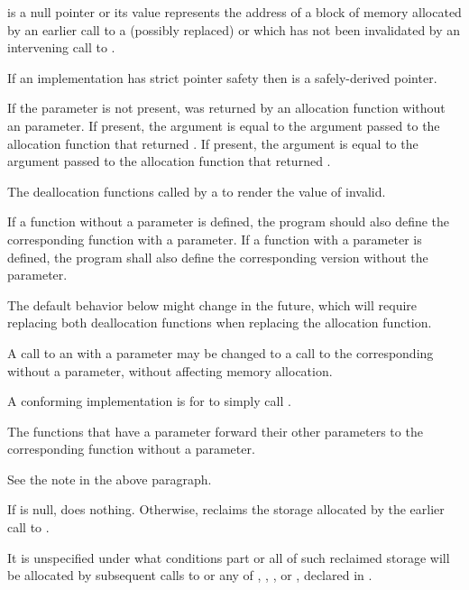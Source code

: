 \begin{itemdescr}
\pnum
\expects
{} is a null pointer or
its value represents the address of
a block of memory allocated by
an earlier call to a (possibly replaced)
or
which has not been invalidated by an intervening call to
.

\pnum
If an implementation has strict pointer safety
then  is a safely-derived pointer.

\pnum
If the  parameter is not present,
 was returned by an allocation function
without an  parameter.
If present, the  argument
is equal to the  argument
passed to the allocation function that returned .
If present, the  argument
is equal to the  argument
passed to the allocation function that returned .

\pnum
\effects
The
deallocation functions
called by a
to render the value of  invalid.

\pnum
\replaceable
{}
If a function without a  parameter is defined,
the program should also define
the corresponding function with a  parameter.
If a function with a  parameter is defined,
the program shall also define
the corresponding version without the  parameter.
\begin{note}
The default behavior below might change in the future, which will require
replacing both deallocation functions when replacing the allocation function.
\end{note}

\pnum
\required
A call to an 
with a  parameter
may be changed to
a call to the corresponding 
without a  parameter,
without affecting memory allocation.
\begin{note}
A conforming implementation is for
 to simply call
.
\end{note}

\pnum
{}
The functions that have a  parameter
forward their other parameters
to the corresponding function without a  parameter.
\begin{note}
See the note in the above \replaceable paragraph.
\end{note}

\pnum
{}
If  is null, does nothing. Otherwise, reclaims the
storage allocated by the earlier call to .

\pnum
\remarks
It is unspecified under what conditions part or all of such
%
reclaimed storage will be allocated by subsequent
calls to
or any of
,
,
,
or
,
declared in .
\end{itemdescr}


